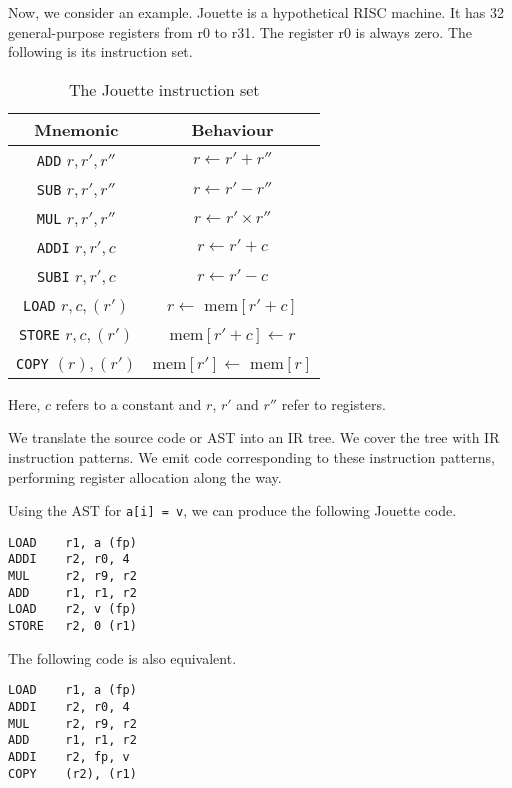 \documentclass[a4paper, openany]{memoir}
\begin{document}
Now, we consider an example. Jouette is a hypothetical RISC machine. It has 32 general-purpose registers from r0 to r31. The register r0 is always zero. The following is its instruction set.
\begin{table}[H]
    \centering
    \begin{tabular}{|c|c|}
        \hline
        Mnemonic & Behaviour \\
        \hline
        \texttt{ADD} $r, r', r''$ & $r \leftarrow r' + r''$ \\
        \texttt{SUB} $r, r', r''$ & $r \leftarrow r' - r''$ \\
        \texttt{MUL} $r, r', r''$ & $r \leftarrow r' \times r''$ \\
        \texttt{ADDI} $r, r', c$ & $r \leftarrow r' + c$ \\
        \texttt{SUBI} $r, r', c$ & $r \leftarrow r' - c$ \\
        \texttt{LOAD} $r, c, (r')$ & $r \leftarrow$ mem$[r' + c]$ \\
        \texttt{STORE} $r, c, (r')$ & mem$[r' + c] \leftarrow r$ \\
        \texttt{COPY} $(r), (r')$ & mem$[r'] \leftarrow$ mem$[r]$ \\
        \hline
    \end{tabular}
    \caption{The Jouette instruction set}
\end{table}
\noindent Here, $c$ refers to a constant and $r$, $r'$ and $r''$ refer to registers.

We translate the source code or AST into an IR tree. We cover the tree with IR instruction patterns. We emit code corresponding to these instruction patterns, performing register allocation along the way.

Using the AST for \texttt{a[i] = v}, we can produce the following Jouette code.
\begin{lstlisting}[language=jouette]
LOAD    r1, a (fp)
ADDI    r2, r0, 4
MUL     r2, r9, r2
ADD     r1, r1, r2
LOAD    r2, v (fp)
STORE   r2, 0 (r1)
\end{lstlisting}
\noindent The following code is also equivalent.
\begin{lstlisting}[language=jouette]
LOAD    r1, a (fp)
ADDI    r2, r0, 4
MUL     r2, r9, r2
ADD     r1, r1, r2
ADDI    r2, fp, v
COPY    (r2), (r1)
\end{lstlisting}
\end{document}
